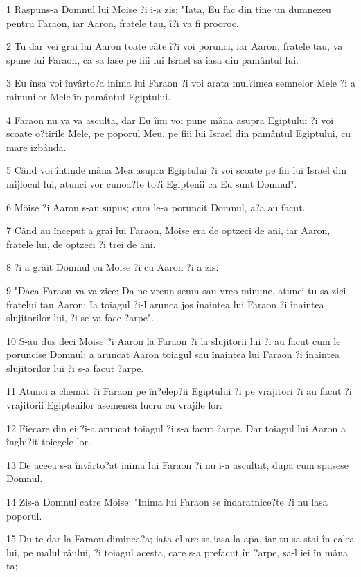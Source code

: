 \par 1 Raspuns-a Domnul lui Moise ?i i-a zis: "Iata, Eu fac din tine un dumnezeu pentru Faraon, iar Aaron, fratele tau, î?i va fi prooroc.
\par 2 Tu dar vei grai lui Aaron toate câte î?i voi porunci, iar Aaron, fratele tau, va spune lui Faraon, ca sa lase pe fiii lui Israel sa iasa din pamântul lui.
\par 3 Eu însa voi învârto?a inima lui Faraon ?i voi arata mul?imea semnelor Mele ?i a minunilor Mele în pamântul Egiptului.
\par 4 Faraon nu va va asculta, dar Eu îmi voi pune mâna asupra Egiptului ?i voi scoate o?tirile Mele, pe poporul Meu, pe fiii lui Israel din pamântul Egiptului, cu mare izbânda.
\par 5 Când voi întinde mâna Mea asupra Egiptului ?i voi scoate pe fiii lui Israel din mijlocul lui, atunci vor cunoa?te to?i Egiptenii ca Eu sunt Domnul".
\par 6 Moise ?i Aaron s-au supus; cum le-a poruncit Domnul, a?a au facut.
\par 7 Când au început a grai lui Faraon, Moise era de optzeci de ani, iar Aaron, fratele lui, de optzeci ?i trei de ani.
\par 8 ?i a grait Domnul cu Moise ?i cu Aaron ?i a zis:
\par 9 "Daca Faraon va va zice: Da-ne vreun semn sau vreo minune, atunci tu sa zici fratelui tau Aaron: Ia toiagul ?i-l arunca jos înaintea lui Faraon ?i înaintea slujitorilor lui, ?i se va face ?arpe".
\par 10 S-au dus deci Moise ?i Aaron la Faraon ?i la slujitorii lui ?i au facut cum le poruncise Domnul: a aruncat Aaron toiagul sau înaintea lui Faraon ?i înaintea slujitorilor lui ?i s-a facut ?arpe.
\par 11 Atunci a chemat ?i Faraon pe în?elep?ii Egiptului ?i pe vrajitori ?i au facut ?i vrajitorii Egiptenilor asemenea lucru cu vrajile lor:
\par 12 Fiecare din ei ?i-a aruncat toiagul ?i s-a facut ?arpe. Dar toiagul lui Aaron a înghi?it toiegele lor.
\par 13 De aceea s-a învârto?at inima lui Faraon ?i nu i-a ascultat, dupa cum spusese Domnul.
\par 14 Zis-a Domnul catre Moise: "Inima lui Faraon se îndaratnice?te ?i nu lasa poporul.
\par 15 Du-te dar la Faraon diminea?a; iata el are sa iasa la apa, iar tu sa stai în calea lui, pe malul râului, ?i toiagul acesta, care s-a prefacut în ?arpe, sa-l iei în mâna ta;
